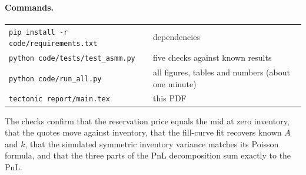 \paragraph{Commands.}
\begin{center}
\small
\begin{tabular}{ll}
\toprule
\texttt{pip install -r code/requirements.txt} & dependencies \\
\texttt{python code/tests/test\_asmm.py} & five checks against known results \\
\texttt{python code/run\_all.py} & all figures, tables and numbers (about one minute) \\
\texttt{tectonic report/main.tex} & this PDF \\
\bottomrule
\end{tabular}
\end{center}

\noindent The checks confirm that the reservation price equals the mid at zero inventory, that the
quotes move against inventory, that the fill-curve fit recovers known $A$ and $k$, that the simulated
symmetric inventory variance matches its Poisson formula, and that the three parts of the PnL
decomposition sum exactly to the PnL.
